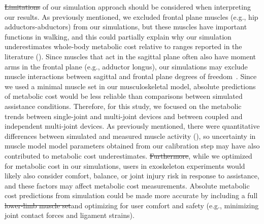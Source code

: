 \documentclass[10pt,letterpaper]{article}
\providecommand{\DIFaddtex}[1]{{\protect\color{blue}{#1}}} %
\providecommand{\DIFdeltex}[1]{{\protect\color{red}\sout{#1}}}                      %
\providecommand{\DIFaddbegin}{} %
\providecommand{\DIFaddend}{} %
\providecommand{\DIFdelbegin}{} %
\providecommand{\DIFdelend}{} %
\providecommand{\DIFadd}[1]{\texorpdfstring{\DIFaddtex{#1}}{#1}} %
\providecommand{\DIFdel}[1]{\texorpdfstring{\DIFdeltex{#1}}{}} %
\newcommand{\DIFscaledelfig}{0.5}
\newlength{\DIFdelgraphicswidth} %
\newlength{\DIFdelgraphicsheight} %
\newcommand{\DIFaddincludegraphics}[2][]{{\color{blue}\fbox{\DIFOincludegraphics[#1]{#2}}}} %
\newcommand{\DIFdelincludegraphics}[2][]{%
\sbox{\DIFdelgraphicsbox}{\DIFOincludegraphics[#1]{#2}}%
\settoboxwidth{\DIFdelgraphicswidth}{\DIFdelgraphicsbox} %
\settoboxtotalheight{\DIFdelgraphicsheight}{\DIFdelgraphicsbox} %
\scalebox{\DIFscaledelfig}{%
\parbox[b]{\DIFdelgraphicswidth}{\usebox{\DIFdelgraphicsbox}\\[-\baselineskip] \rule{\DIFdelgraphicswidth}{0em}}\llap{\resizebox{\DIFdelgraphicswidth}{\DIFdelgraphicsheight}{%
\setlength{\unitlength}{\DIFdelgraphicswidth}%
\begin{picture}(1,1)%
\thicklines\linethickness{2pt} %
{\color[rgb]{1,0,0}\put(0,0){\framebox(1,1){}}}%
{\color[rgb]{1,0,0}\put(0,0){\line( 1,1){1}}}%
{\color[rgb]{1,0,0}\put(0,1){\line(1,-1){1}}}%
\end{picture}%
}*{3pt}}} %
} %
\DeclareRobustCommand{\DIFaddbegin}{\DIFOaddbegin \let\includegraphics\DIFaddincludegraphics} %
\DeclareRobustCommand{\DIFaddend}{\DIFOaddend \let\includegraphics\DIFOincludegraphics} %
\DeclareRobustCommand{\DIFdelbegin}{\DIFOdelbegin \let\includegraphics\DIFdelincludegraphics} %
\DeclareRobustCommand{\DIFdelend}{\DIFOaddend \let\includegraphics\DIFOincludegraphics} %
\begin{document}
\DIFdelbegin \DIFdel{Limitations }\DIFdelend \DIFaddbegin \DIFadd{Other limitations }\DIFaddend of our simulation approach should be considered when interpreting our results. As previously mentioned, we excluded frontal plane muscles (e.g., hip adductors-abductors) from our simulations, but these muscles have important functions in walking, and this could partially explain why our simulation underestimates whole-body metabolic cost relative to ranges reported in the literature (). Since muscles that act in the sagittal plane often also have moment arms in the frontal plane (e.g., adductor longus), our simulations may exclude muscle interactions between sagittal and frontal plane degrees of freedom~\cite{Dembia:2017}. \DIFaddbegin \DIFadd{We also did not include upper-extremity muscles in our simulations, which would have contributed to our total metabolic cost estimates. }\DIFaddend Since we used a minimal muscle set in our musculoskeletal model, absolute predictions of metabolic cost would be less reliable than comparisons between simulated assistance conditions. Therefore, for this study, we focused on the metabolic trends between single-joint and multi-joint devices and between coupled and independent multi-joint devices. As previously mentioned, there were quantitative differences between simulated and measured muscle activity (), so uncertainty in muscle model model parameters obtained from our calibration step may have also contributed to metabolic cost underestimates. \DIFdelbegin \DIFdel{Furthermore}\DIFdelend \DIFaddbegin \DIFadd{In addition}\DIFaddend , while we optimized for metabolic cost in our simulations, users in exoskeleton experiments would likely also consider comfort, balance, or joint injury risk in response to assistance, and these factors may affect metabolic cost measurements. Absolute metabolic cost predictions from simulation could be made more accurate by including a full \DIFdelbegin \DIFdel{lower-limb muscle set}\DIFdelend \DIFaddbegin \DIFadd{whole-body muscle set, including upper-extremity muscles, }\DIFaddend and optimizing for user comfort and safety (e.g., minimizing joint contact forces and ligament strains).
\end{document}
